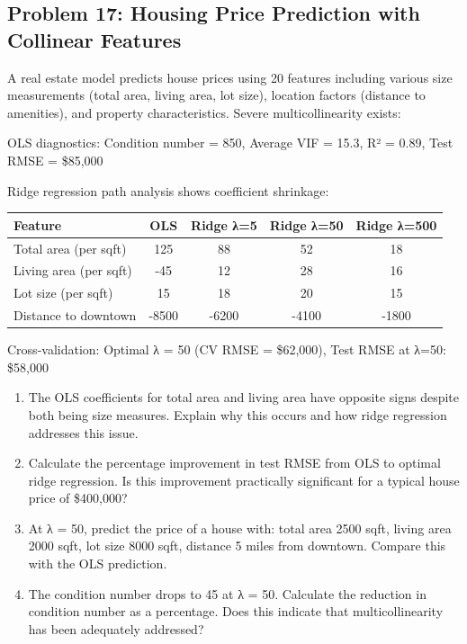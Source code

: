 \documentclass[12pt]{article}
\begin{document}
\subsection*{Problem 17: Housing Price Prediction with Collinear Features}

A real estate model predicts house prices using 20 features including various size measurements (total area, living area, lot size), location factors (distance to amenities), and property characteristics. Severe multicollinearity exists:

OLS diagnostics: Condition number = 850, Average VIF = 15.3, R² = 0.89, Test RMSE = \$85,000

Ridge regression path analysis shows coefficient shrinkage:

\begin{center}
\begin{tabular}{lcccc}
\toprule
Feature & OLS & Ridge λ=5 & Ridge λ=50 & Ridge λ=500 \\
\midrule
Total area (per sqft) & 125 & 88 & 52 & 18 \\
Living area (per sqft) & -45 & 12 & 28 & 16 \\
Lot size (per sqft) & 15 & 18 & 20 & 15 \\
Distance to downtown & -8500 & -6200 & -4100 & -1800 \\
\bottomrule
\end{tabular}
\end{center}

Cross-validation: Optimal λ = 50 (CV RMSE = \$62,000), Test RMSE at λ=50: \$58,000

\begin{enumerate}[label=(\alph*)]
\item The OLS coefficients for total area and living area have opposite signs despite both being size measures. Explain why this occurs and how ridge regression addresses this issue.

\item Calculate the percentage improvement in test RMSE from OLS to optimal ridge regression. Is this improvement practically significant for a typical house price of \$400,000?

\item At λ = 50, predict the price of a house with: total area 2500 sqft, living area 2000 sqft, lot size 8000 sqft, distance 5 miles from downtown. Compare this with the OLS prediction.

\item The condition number drops to 45 at λ = 50. Calculate the reduction in condition number as a percentage. Does this indicate that multicollinearity has been adequately addressed?
\end{enumerate}
\end{document}
